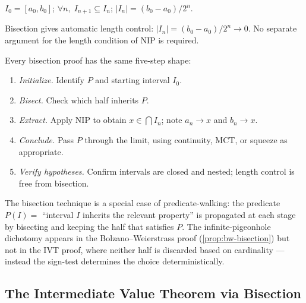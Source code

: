 \begin{remark}
$I_0=[a_0,b_0]$;\;
$\forall n,\;I_{n+1}\subseteq I_n$;\;
$|I_n|=(b_0-a_0)/2^n$.
\end{remark}

\begin{remark}
Bisection gives automatic length control: $|I_n|=(b_0-a_0)/2^n\to 0$.
No separate argument for the length condition of NIP is required.
\end{remark}

\begin{remark}
Every bisection proof has the same five-step shape:
\begin{enumerate}
  \item \emph{Initialize.} Identify $P$ and starting interval $I_0$.
  \item \emph{Bisect.} Check which half inherits $P$.
  \item \emph{Extract.} Apply NIP to obtain $x\in\bigcap I_n$;
        note $a_n\to x$ and $b_n\to x$.
  \item \emph{Conclude.} Pass $P$ through the limit, using continuity,
        MCT, or squeeze as appropriate.
  \item \emph{Verify hypotheses.} Confirm intervals are closed and nested;
        length control is free from bisection.
\end{enumerate}
\end{remark}

\begin{remark}
The bisection technique is a special case of predicate-walking: the predicate
$P(I)=$ ``interval $I$ inherits the relevant property'' is propagated at
each stage by bisecting and keeping the half that satisfies $P$. The
infinite-pigeonhole dichotomy appears in the Bolzano--Weierstrass proof
(\cref{prop:bw-bisection}) but not in the IVT proof, where neither half
is discarded based on cardinality --- instead the sign-test determines
the choice deterministically.
\end{remark}



\subsection*{The Intermediate Value Theorem via Bisection}
\label{subsec:ivt-bisection}

